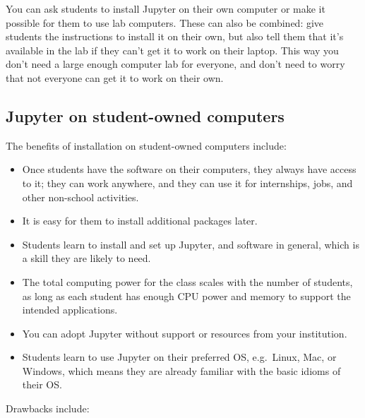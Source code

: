 \documentclass[]{book}
\begin{document}
You can ask students to install Jupyter on their own computer or make it
possible for them to use lab computers. These can also be combined: give
students the instructions to install it on their own, but also tell them
that it's available in the lab if they can't get it to work on their
laptop. This way you don't need a large enough computer lab for
everyone, and don't need to worry that not everyone can get it to work
on their own.

\subsection{Jupyter on student-owned
computers}\label{jupyter-on-student-owned-computers}

The benefits of installation on student-owned computers include:

\begin{itemize}
\item
  Once students have the software on their computers, they always have
  access to it; they can work anywhere, and they can use it for
  internships, jobs, and other non-school activities.
\item
  It is easy for them to install additional packages later.
\item
  Students learn to install and set up Jupyter, and software in general,
  which is a skill they are likely to need.
\item
  The total computing power for the class scales with the number of
  students, as long as each student has enough CPU power and memory to
  support the intended applications.
\item
  You can adopt Jupyter without support or resources from your
  institution.
\item
  Students learn to use Jupyter on their preferred OS, e.g.~Linux, Mac,
  or Windows, which means they are already familiar with the basic
  idioms of their OS.
\end{itemize}

Drawbacks include:
\end{document}
